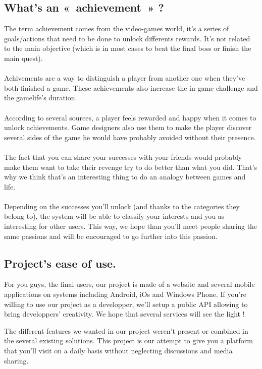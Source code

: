 \documentclass{life-en}
\begin{document}
\subsection{What's an «~achievement~» ?}
The term achievement comes from the video-games world, it's a series of goals/actions that need to be done to unlock differents rewards. It's not related to the main objective (which is in most cases to beat the final boss or finish the main quest).\\
\\
Achivements are a way to distinguish a player from another one when they've both finished a game. These achievements also increase the in-game challenge and the gamelife's duration.\\
\\
According to several sources, a player feels rewarded and happy when it comes to unlock achievements. Game designers also use them to make 
the player discover several sides of the game he would have probably avoided without their presence.\\
\\
The fact that you can share your successes with your friends would probably make them want to take their revenge try to do better than what you did.
That's why we think that's an interesting thing to do an analogy between games and life.\\
\\

Depending on the successes you'll unlock (and thanks to the categories they belong to), the system will be able to classify your interests and you as interesting for other users. This way, we hope than you'll meet 
people sharing the same passions and will be encouraged to go further into this passion.\\



\subsection{Project's ease of use.}

For you guys, the final users, our project is made of a website and several mobile applications on systems including Android, iOs and Windows Phone. If you're willing to use our project as a developper, we'll setup a public API allowing to bring developpers' creativity. We hope that several services will see the light !

The different features we wanted in our project weren't present or combined in the several existing solutions. This project is our attempt to give you a platform that you'll visit on a daily basis without neglecting discussions and media sharing.
\end{document}
